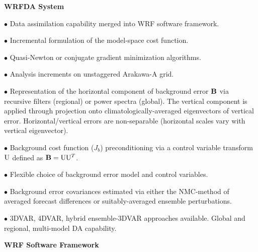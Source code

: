 \vskip 12pt
{\noindent\bf WRFDA System}
\vskip 12pt

\begin{description}
\setlength{\itemsep}{-5pt}
\item{$\bullet$} Data assimilation capability merged into WRF software framework.
%
\item{$\bullet$} Incremental formulation of the model-space cost function.
%
\item{$\bullet$} Quasi-Newton or conjugate gradient minimization algorithms.
%
\item{$\bullet$} Analysis increments on unstaggered Arakawa-A grid.
%
\item{$\bullet$} Representation of the horizontal component of background 
error ${\bf B}$ via recursive filters (regional) or power spectra (global). The
vertical component is applied through projection onto climatologically-averaged 
eigenvectors of vertical error. Horizontal/vertical errors are
non-separable (horizontal scales vary with vertical eigenvector).
%
\item{$\bullet$}  Background cost function ($J_b$) preconditioning 
via a control variable transform ${\rm U}$ defined as ${\bf B}={\rm U} {\rm U}^T$.
%
\item{$\bullet$} Flexible choice of background error model and control variables.
%
\item{$\bullet$} Background error covariances estimated via either the
NMC-method of averaged forecast differences or suitably-averaged
ensemble perturbations.
%
\item{$\bullet$} 3DVAR, 4DVAR, hybrid ensemble-3DVAR approaches available. 
Global and regional, multi-model DA capability.
%
\end{description}


\vskip 12pt
{\noindent\bf WRF Software Framework}
\vskip 12pt

